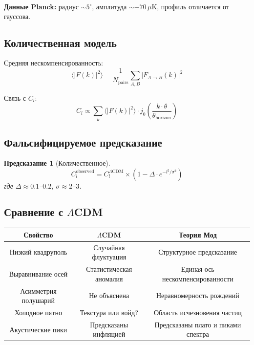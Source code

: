 \documentclass[11pt,a4paper]{article}
\newtheorem{prediction}{Предсказание}[section]
\theoremstyle{definition}
\begin{document}
\textbf{Данные Planck:} радиус $\sim 5^\circ$, амплитуда $\sim -70\,\mu\text{K}$, профиль отличается от гауссова.

\subsection{Количественная модель}

Средняя нескомпенсированность:
\begin{equation}
    \langle |F(k)|^2 \rangle = \frac{1}{N_{\text{pairs}}} \sum_{A,B} |F_{A \to B}(k)|^2
\end{equation}

Связь с $C_l$:
\begin{equation}
    C_l \propto \sum_k \langle |F(k)|^2 \rangle \cdot j_0\!\left( \frac{k \cdot \theta}{\theta_{\text{horizon}}} \right)
\end{equation}

\subsection{Фальсифицируемое предсказание}

\begin{prediction}[Количественное]
\begin{equation}
    C_l^{\text{observed}} = C_l^{\Lambda\text{CDM}} \times \left( 1 - \Delta \cdot e^{-l^2 / \sigma^2} \right)
\end{equation}
где $\Delta \approx 0.1$--$0.2$, $\sigma \approx 2$--$3$.
\end{prediction}

\subsection{Сравнение с $\Lambda$CDM}

\begin{center}
\begin{tabular}{c|c|c}
\textbf{Свойство} & \textbf{$\Lambda$CDM} & \textbf{Теория Мод} \\
\hline
Низкий квадруполь & Случайная флуктуация & Структурное предсказание \\
Выравнивание осей & Статистическая аномалия & Единая ось нескомпенсированности \\
Асимметрия полушарий & Не объяснена & Неравномерность рождений \\
Холодное пятно & Текстура или войд? & Область исчезновения частиц \\
Акустические пики & Предсказаны инфляцией & Предсказаны плато и пиками спектра
\end{tabular}
\end{center}
\end{document}
